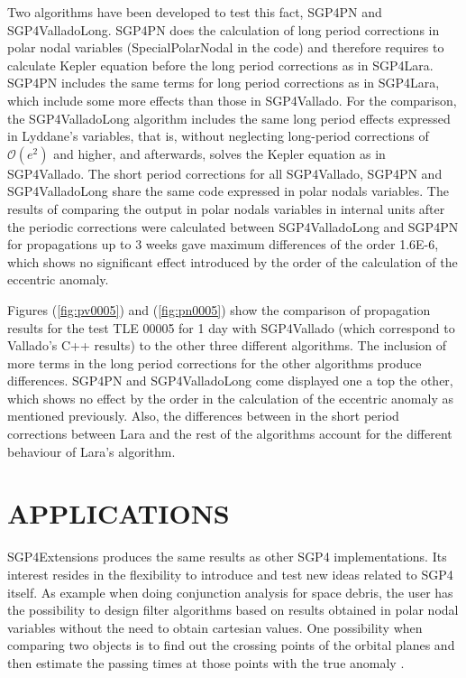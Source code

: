 \documentclass{article}
\begin{document}
Two algorithms have been developed to test this fact, SGP4PN and SGP4ValladoLong.
SGP4PN does the calculation of long period corrections in polar nodal variables (SpecialPolarNodal in the code) and therefore requires
to calculate Kepler equation before the long period corrections as in SGP4Lara. SGP4PN includes the same terms for long period corrections as in SGP4Lara,
which include some more effects than those in SGP4Vallado. For the comparison, the SGP4ValladoLong algorithm includes the same long period effects expressed
in Lyddane's variables, that is, without neglecting long-period corrections of $\mathcal{O}(e^2)$ and higher, and afterwards, solves the Kepler equation as in SGP4Vallado.
The short period corrections for all SGP4Vallado, SGP4PN and SGP4ValladoLong share the same code expressed in polar nodals variables.
The results of comparing the output in polar nodals variables in internal units after the periodic corrections were calculated between SGP4ValladoLong and SGP4PN for propagations up to 3 weeks
gave maximum differences of the order 1.6E-6, which shows no significant effect introduced by the order of the calculation of the eccentric anomaly.

Figures (\ref{fig:pv0005}) and (\ref{fig:pn0005}) show the comparison of propagation results for the test TLE 00005 for 1 day with SGP4Vallado (which correspond to Vallado's C++ results) to the other three different algorithms.
The inclusion of more terms in the long period corrections for the other algorithms produce differences.
SGP4PN and SGP4ValladoLong come displayed one a top the other, which shows no effect by the order in the calculation of the eccentric anomaly as mentioned previously.
Also, the differences between in the short period corrections between Lara and the rest of the algorithms account for the different behaviour of Lara's algorithm.

\section{APPLICATIONS}
\label{sec:applications}
SGP4Extensions produces the same results as other SGP4 implementations.
Its interest resides in the flexibility to introduce and test new ideas related to SGP4 itself.
As example when doing conjunction analysis for space debris, the user has the possibility to design
filter algorithms based on results obtained in polar nodal variables without
the need to obtain cartesian values. One possibility when comparing two objects
is to find out the crossing points of the orbital planes and then estimate the passing times
at those points with the true anomaly \cite[sec. 9.6]{Aba2012}.
\end{document}
